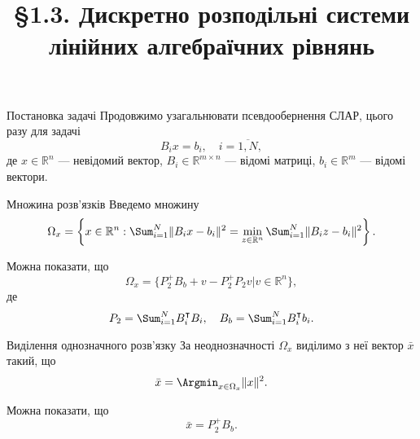 \title[Дискретно розподільні СЛАР]
{\S1.3. Дискретно розподільні системи \\ лінійних алгебраїчних рівнянь}

\begin{frame}
    \titlepage
\end{frame}

\begin{mframe}{Постановка задачі}
    Продовжимо узагальнювати псевдообернення СЛАР, цього разу для задачі
    \begin{equation}
        \label{eq:1.23}
        B_i x = b_i, \quad i = \overline{1, N},
    \end{equation}
    де $x \in \mathbb{R}^n$ --- невідомий вектор,
    $B_i \in \mathbb{R}^{m \times n}$ --- відомі матриці,
    $b_i \in \mathbb{R}^m$ --- відомі вектори.
\end{mframe}

\begin{mframe}{Множина розв'язків}
    Введемо множину
    \begin{equation}
        \label{eq:1.24}
        \Omega_x = \left\{ x \in \mathbb{R}^n: \Sum_{i = 1}^N 
        \|B_i x - b_i\|^2 = \min_{z \in \mathbb{R}^n} 
        \Sum_{i = 1}^N \|B_i z - b_i\|^2 \right\}.
    \end{equation}
    
    Можна показати, що
    \begin{equation}
        \label{eq:1.26a}
        \Omega_x = \Big\{ P_2^+ B_b + v - P_2^+ P_2 v \Big| 
        v \in \mathbb{R}^n \Big\},
    \end{equation}
    де
    \begin{equation*}
        P_2 = \Sum_{i = 1}^N B_i^\intercal B_i, \quad B_b = 
        \Sum_{i = 1}^N B_i^\intercal b_i.
    \end{equation*}
\end{mframe}

\begin{mframe}{Виділення однозначного розв'язку}
    За неоднозначності $\Omega_x$ виділимо з неї вектор $\bar x$ такий, що
    \begin{equation}
        \label{eq:1.25}
        \bar x = \Argmin_{x \in \Omega_x} \|x\|^2.
    \end{equation}
    
    Можна показати, що
    \begin{equation}
        \label{eq:1.27a}
        \bar x = P_2^+ B_b.
    \end{equation}
\end{mframe}

